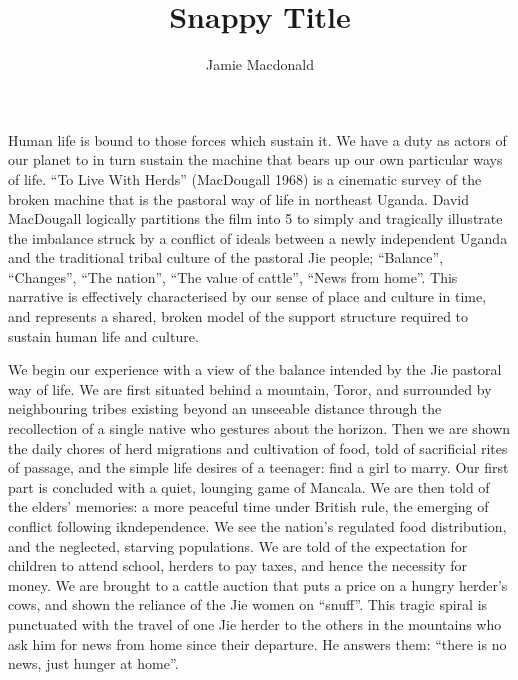 \documentclass[12pt, letterpaper, oneside]{article}
\title{Snappy Title}
\author{Jamie Macdonald}
\begin{document}
\maketitle
Human life is bound to those forces which sustain it. We have a duty as actors of our planet to in turn sustain the machine that bears up our own particular ways of life. ``To Live With Herds'' (MacDougall 1968) is a cinematic survey of the broken machine that is the pastoral way of life in northeast Uganda. David MacDougall logically partitions the film into 5 to simply and tragically illustrate the imbalance struck by a conflict of ideals between a newly independent Uganda and the traditional tribal culture of the pastoral Jie people; ``Balance'', ``Changes'', ``The nation'', ``The value of cattle'', ``News from home''. This narrative is effectively characterised by our sense of place and culture in time, and represents a shared, broken model of the support structure required to sustain human life and culture.

We begin our experience with a view of the balance intended by the Jie pastoral way of life. We are first situated behind a mountain, Toror, and surrounded by neighbouring tribes existing beyond an unseeable distance through the recollection of a single native who gestures about the horizon. Then we are shown the daily chores of herd migrations and cultivation of food, told of sacrificial rites of passage, and the simple life desires of a teenager: find a girl to marry. Our first part is concluded with a quiet, lounging game of Mancala. We are then told of the elders' memories: a more peaceful time under British rule, the emerging of conflict following ikndependence. We see the nation's regulated food distribution, and the neglected, starving populations. We are told of the expectation for children to attend school, herders to pay taxes, and hence the necessity for money. We are brought to a cattle auction that puts a price on a hungry herder's cows, and shown the reliance of the Jie women on ``snuff''. This tragic spiral is punctuated with the travel of one Jie herder to the others in the mountains who ask him for news from home since their departure. He answers them: ``there is no news, just hunger at home''.
\end{document}
